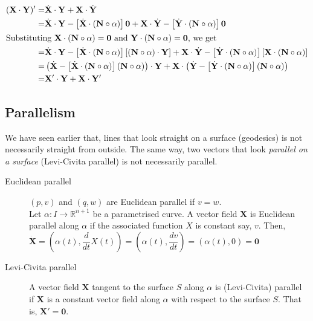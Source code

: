 \begin{enumerate}
\begin{align*}
		(\mathbf{X} \cdot \mathbf{Y})' = & \dot{\mathbf{X}} \cdot \mathbf{Y} + \mathbf{X} \cdot \dot{\mathbf{Y}}\\
		= & \dot{\mathbf{X}} \cdot \mathbf{Y} - \left[ \dot{\mathbf{X}} \cdot (\mathbf{N} \circ \alpha) \right]\mathbf{0} + \mathbf{X} \cdot \dot{\mathbf{Y}} - \left[ \dot{\mathbf{Y}} \cdot (\mathbf{N} \circ \alpha) \right]\mathbf{0} \\
		\intertext{Substituting $\mathbf{X} \cdot (\mathbf{N} \circ \alpha ) = \mathbf{0}$ and $\mathbf{Y} \cdot (\mathbf{N} \circ \alpha) = \mathbf{0}$, we get}
		= & \dot{\mathbf{X}} \cdot \mathbf{Y} - \left[ \dot{\mathbf{X}} \cdot (\mathbf{N} \circ \alpha) \right] \left[ (\mathbf{N} \circ \alpha) \cdot \mathbf{Y} \right] + \mathbf{X} \cdot \dot{\mathbf{Y}} - \left[ \dot{\mathbf{Y}} \cdot (\mathbf{N} \circ \alpha) \right] \left[ \mathbf{X} \cdot (\mathbf{N} \circ \alpha) \right] \\
		= & \left( \dot{\mathbf{X}} - \left[ \dot{\mathbf{X}} \cdot (\mathbf{N} \circ \alpha) \right] (\mathbf{N} \circ \alpha) \right) \cdot \mathbf{Y} + \mathbf{X} \cdot \left( \dot{\mathbf{Y}} - \left[ \dot{\mathbf{Y}} \cdot (\mathbf{N} \circ \alpha) \right](\mathbf{N} \circ \alpha) \right) \\
		= & \mathbf{X}' \cdot \mathbf{Y} + \mathbf{X} \cdot \mathbf{Y}'
	\end{align*}
\end{enumerate}


\subsection{Parallelism}
	We have seen earlier that, lines that look straight on a surface (geodesics) is not necessarily straight from outside. The same way, two vectors that look \textit{parallel on a surface} (Levi-Civita parallel) is not necessarily parallel.
\begin{description}
	\item[Euclidean parallel] $(p,v)$ and $(q,w)$ are Euclidean parallel if $v = w$.\\
		Let $\alpha : I \to \mathbb{R}^{n+1}$ be a parametrised curve. A vector field $\mathbf{X}$ is Euclidean parallel along $\alpha$ if the associated function $X$ is constant say, $v$.
		Then, $\dot{\mathbf{X}} = \left( \alpha(t),\dfrac{d}{dt}X(t) \right) = \left( \alpha(t), \dfrac{dv}{dt} \right) = \left( \alpha(t), 0 \right) = \mathbf{0}$
	\item[Levi-Civita parallel] A vector field $\mathbf{X}$ tangent to the surface $S$ along $\alpha$ is (Levi-Civita) parallel if $\mathbf{X}$ is a constant vector field along $\alpha$ with respect to the surface $S$. That is, $\mathbf{X}' = \mathbf{0}$.
\end{description}


